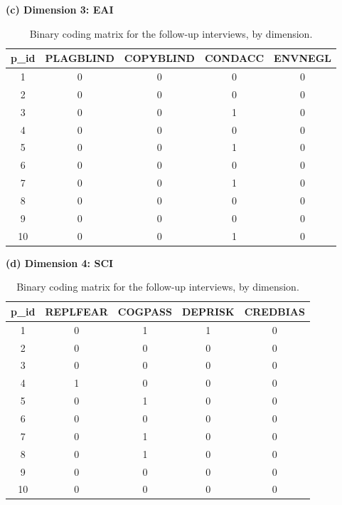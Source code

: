 \begin{table}
\vspace{1.5em}

\begin{minipage}[t]{0.48\textwidth}
\centering
\small
\textbf{(c) Dimension 3: EAI}

\vspace{0.4em}

\begin{tabular}{ccccc}
\hline
p\_id & PLAGBLIND & COPYBLIND & CONDACC & ENVNEGL \\
\hline
1  & 0 & 0 & 0 & 0 \\
2  & 0 & 0 & 0 & 0 \\
3  & 0 & 0 & 1 & 0 \\
4  & 0 & 0 & 0 & 0 \\
5  & 0 & 0 & 1 & 0 \\
6  & 0 & 0 & 0 & 0 \\
7  & 0 & 0 & 1 & 0 \\
8  & 0 & 0 & 0 & 0 \\
9  & 0 & 0 & 0 & 0 \\
10 & 0 & 0 & 1 & 0 \\
\hline
\end{tabular}
\end{minipage}
\hfill
\begin{minipage}[t]{0.48\textwidth}
\centering
\small
\textbf{(d) Dimension 4: SCI}

\vspace{0.4em}

\begin{tabular}{ccccc}
\hline
p\_id & REPLFEAR & COGPASS & DEPRISK & CREDBIAS \\
\hline
1  & 0 & 1 & 1 & 0 \\
2  & 0 & 0 & 0 & 0 \\
3  & 0 & 0 & 0 & 0 \\
4  & 1 & 0 & 0 & 0 \\
5  & 0 & 1 & 0 & 0 \\
6  & 0 & 0 & 0 & 0 \\
7  & 0 & 1 & 0 & 0 \\
8  & 0 & 1 & 0 & 0 \\
9  & 0 & 0 & 0 & 0 \\
10 & 0 & 0 & 0 & 0 \\
\hline
\end{tabular}
\end{minipage}

\caption{Binary coding matrix for the follow-up interviews, by dimension.}
\label{final_coding_fu}
\end{table}
\clearpage
